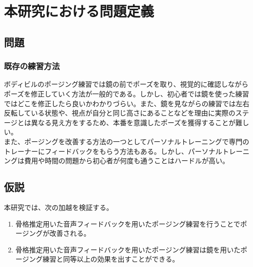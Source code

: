 \chapter{本研究における問題定義}
\label{issue}
\section{問題}
\subsection{既存の練習方法}
ボディビルのポージング練習では鏡の前でポーズを取り、視覚的に確認しながらポーズを修正していく方法が一般的である。しかし、初心者では鏡を使った練習ではどこを修正したら良いかわかりづらい。また、鏡を見ながらの練習では左右反転している状態や、視点が自分と同じ高さにあることなどを理由に実際のステージとは異なる見え方をするため、本番を意識したポーズを獲得することが難しい。\\
また、ポージングを改善する方法の一つとしてパーソナルトレーニングで専門のトレーナーにフィードバックをもらう方法もある。しかし、パーソナルトレーニングは費用や時間の問題から初心者が何度も通うことはハードルが高い。

\section{仮説}
本研究では、次の加越を検証する。
\begin{enumerate}
  \item 骨格推定用いた音声フィードバックを用いたポージング練習を行うことでポージングが改善される。
  \item 骨格推定用いた音声フィードバックを用いたポージング練習は鏡を用いたポージング練習と同等以上の効果を出すことができる。
 \end{enumerate}
